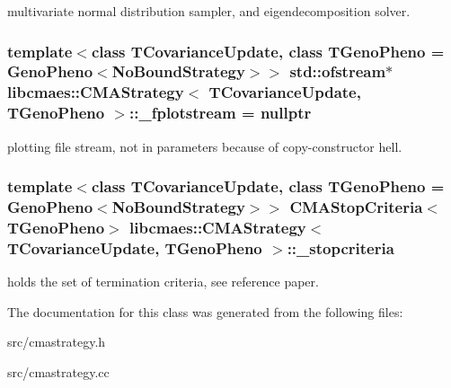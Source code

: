 multivariate normal distribution sampler, and eigendecomposition solver. \hypertarget{classlibcmaes_1_1CMAStrategy_ad05db57e25a5aa2d4abe9cb030406236}{
\subsubsection[{\-\_\-fplotstream}]{\setlength{\rightskip}{0pt plus 5cm}template$<$class T\-Covariance\-Update, class T\-Geno\-Pheno = Geno\-Pheno$<$\-No\-Bound\-Strategy$>$$>$ std\-::ofstream$\ast$ {\bf libcmaes\-::\-C\-M\-A\-Strategy}$<$ T\-Covariance\-Update, T\-Geno\-Pheno $>$\-::\-\_\-fplotstream = nullptr\hspace{0.3cm}{\ttfamily [protected]}}}\label{classlibcmaes_1_1CMAStrategy_ad05db57e25a5aa2d4abe9cb030406236}
plotting file stream, not in parameters because of copy-\/constructor hell. \hypertarget{classlibcmaes_1_1CMAStrategy_af7b7c6bf3018f5e3d57f2875215bba0c}{
\subsubsection[{\-\_\-stopcriteria}]{\setlength{\rightskip}{0pt plus 5cm}template$<$class T\-Covariance\-Update, class T\-Geno\-Pheno = Geno\-Pheno$<$\-No\-Bound\-Strategy$>$$>$ {\bf C\-M\-A\-Stop\-Criteria}$<$T\-Geno\-Pheno$>$ {\bf libcmaes\-::\-C\-M\-A\-Strategy}$<$ T\-Covariance\-Update, T\-Geno\-Pheno $>$\-::\-\_\-stopcriteria\hspace{0.3cm}{\ttfamily [protected]}}}\label{classlibcmaes_1_1CMAStrategy_af7b7c6bf3018f5e3d57f2875215bba0c}
holds the set of termination criteria, see reference paper. 

The documentation for this class was generated from the following files\-:\begin{DoxyCompactItemize}
\item 
src/cmastrategy.\-h\item 
src/cmastrategy.\-cc\end{DoxyCompactItemize}

